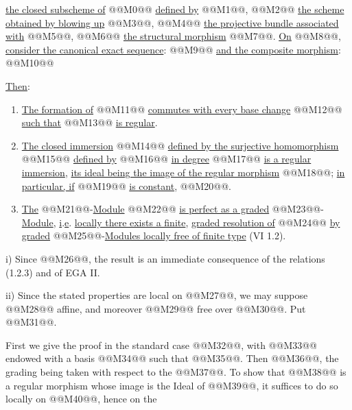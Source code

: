 \uline{the closed subscheme of} @@M0@@ \uline{defined by} @@M1@@, @@M2@@ \uline{the scheme obtained by blowing up} @@M3@@, @@M4@@ \uline{the projective bundle associated with} @@M5@@, @@M6@@ \uline{the structural morphism} @@M7@@. \uline{On} @@M8@@, \uline{consider the canonical exact sequence}:
@@M9@@
\uline{and the composite morphism}:
@@M10@@

\uline{Then}:
\begin{enumerate}[label=\roman*)]
\item \uline{The formation of} @@M11@@ \uline{commutes with every base change} @@M12@@ \uline{such that} @@M13@@ \uline{is regular}.
\item \uline{The closed immersion} @@M14@@ \uline{defined by the surjective homomorphism} @@M15@@ \uline{defined by} @@M16@@ \uline{in degree} @@M17@@ \uline{is a regular immersion}, \uline{its ideal being the image of the regular morphism} @@M18@@; \uline{in particular, if} @@M19@@ \uline{is constant}, @@M20@@.
\item \uline{The} @@M21@@-\uline{Module} @@M22@@ \uline{is perfect as a graded} @@M23@@-\uline{Module}, \uline{i}.\uline{e}. \uline{locally there exists a finite}, \uline{graded resolution of} @@M24@@ \uline{by graded} @@M25@@-\uline{Modules locally free of finite type} (VI 1.2).
\end{enumerate}

i) Since @@M26@@, the result is an immediate consequence of the relations (1.2.3) and of EGA II.

ii) Since the stated properties are local on @@M27@@, we may suppose @@M28@@ affine, and moreover @@M29@@ free over @@M30@@. Put @@M31@@.

First we give the proof in the standard case @@M32@@, with @@M33@@ endowed with a basis @@M34@@ such that @@M35@@. Then @@M36@@, the grading being taken with respect to the @@M37@@. To show that @@M38@@ is a regular morphism whose image is the Ideal of @@M39@@, it suffices to do so locally on @@M40@@, hence on the
